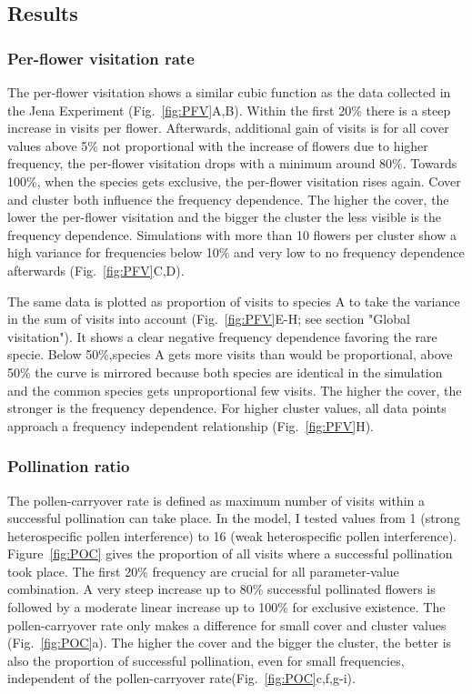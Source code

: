 \label{ch:results_model}

\subsection{Results}

\subsubsection*{Per-flower visitation rate}
The per-flower visitation shows a similar cubic function as the data collected in the Jena Experiment (Fig.~\ref{fig:PFV}A,B). Within the first 20\% there is a steep increase in visits per flower. Afterwards, additional gain of visits is for all cover values above 5\% not proportional with the increase of flowers due to higher frequency, the per-flower visitation drops with a minimum around 80\%. Towards 100\%, when the species gets exclusive, the per-flower visitation rises again. 
Cover and cluster both influence the frequency dependence. The higher the cover, the lower the per-flower visitation and the bigger the cluster the less visible is the frequency dependence. Simulations with more than 10 flowers per cluster show a high variance for frequencies below 10\% and very low to no frequency dependence afterwards (Fig.~\ref{fig:PFV}C,D). 

The same data is plotted as proportion of visits to species A to take the variance in the sum of visits into account (Fig.~\ref{fig:PFV}E-H; see section "Global visitation"). It shows a clear negative frequency dependence favoring the rare specie. Below 50\%,species A gets more visits than would be proportional, above 50\% the curve is mirrored because both species are identical in the simulation and the common species gets unproportional few visits. The higher the cover, the stronger is the frequency dependence. For higher cluster values, all data points approach a frequency independent relationship (Fig.~\ref{fig:PFV}H). 

\subsubsection*{Pollination ratio}
The pollen-carryover rate is defined as maximum number of visits within a successful pollination can take place. In the model, I tested values from 1 (strong heterospecific pollen interference) to 16 (weak heterospecific pollen interference). Figure~\ref{fig:POC} gives the proportion of all visits where a successful pollination took place. The first 20\% frequency are crucial for all parameter-value combination. A very steep increase up to 80\% successful pollinated flowers is followed by a moderate linear increase up to 100\% for exclusive existence. The pollen-carryover rate only makes a difference for small cover and cluster values (Fig.~\ref{fig:POC}a). The higher the cover and the bigger the cluster, the better is also the proportion of successful pollination, even for small frequencies, independent of the pollen-carryover rate(Fig.~\ref{fig:POC}c,f,g-i). 

